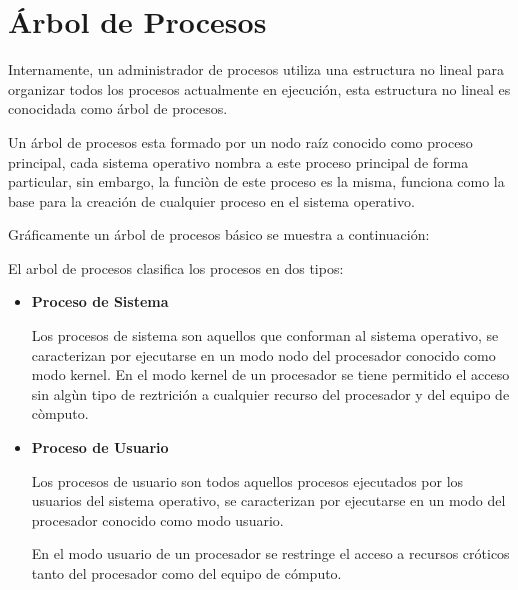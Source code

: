 \documentclass[12pt, fleqn]{report}                             %
\begin{document}
        \clearpage
        \section{Árbol de Procesos}

            Internamente, un administrador de procesos utiliza una estructura no lineal para organizar todos
            los procesos actualmente en ejecución, esta estructura no lineal es conocidada como árbol de procesos.

            Un árbol de procesos esta formado por un nodo raíz conocido como proceso principal, cada sistema
            operativo nombra a este proceso principal de forma particular, sin embargo, la funciòn de este proceso
            es la misma, funciona como la base para la creación de cualquier proceso en el sistema operativo.

            Gráficamente un árbol de procesos básico se muestra a continuación: 

            El arbol de procesos clasifica los procesos en dos tipos:

            \begin{itemize}
                \item
                    \textbf{Proceso de Sistema}

                    Los procesos de sistema son aquellos que conforman al sistema operativo, se caracterizan
                    por ejecutarse en un modo nodo del procesador conocido como modo kernel.
                    En el modo kernel de un procesador se tiene permitido el acceso sin algùn tipo de reztrición
                    a cualquier recurso del procesador y del equipo de còmputo.


                \item
                    \textbf{Proceso de Usuario}

                    Los procesos de usuario son todos aquellos procesos ejecutados por los usuarios del sistema
                    operativo, se caracterizan por ejecutarse en un modo del procesador conocido como modo usuario.

                    En el modo usuario de un procesador se restringe el acceso a recursos cróticos tanto del
                    procesador como del equipo de cómputo.

            \end{itemize}
\end{document}
